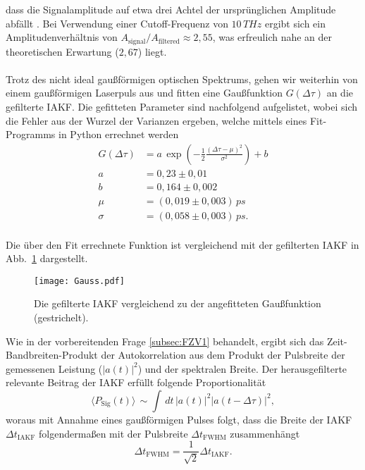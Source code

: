 dass die Signalamplitude auf etwa drei Achtel der ursprünglichen Amplitude abfällt \cite{Anleitung}. Bei Verwendung einer 
Cutoff-Frequenz von $10\,\si{THz}$ ergibt sich ein Amplitudenverhältnis von 
$A_{\text{signal}}/A_{\text{filtered}} \approx 2,55$, was erfreulich nahe an der theoretischen Erwartung ($2,67$) liegt. \\\\
Trotz des nicht ideal gaußförmigen optischen Spektrums, gehen wir weiterhin von einem gaußförmigen 
Laserpuls aus und fitten eine Gaußfunktion $G(\Delta\tau)$ an die gefilterte IAKF. 
Die gefitteten Parameter sind nachfolgend aufgelistet, wobei sich die Fehler aus der Wurzel der Varianzen ergeben, 
welche mittels eines Fit-Programms in Python errechnet werden
\begin{align}
    G(\Delta\tau) &= a\,\exp\left(-\frac{1}{2}\frac{(\Delta\tau - \mu)^2}{\sigma^2}\right) + b \\
    a &= 0,23 \pm 0,01 \\
    b &= 0,164 \pm 0,002 \\
    \mu &= (0,019 \pm 0,003)\,\si{ps} \\
    \sigma &= (0,058 \pm 0,003)\,\si{ps}.
\end{align} \,\\
Die über den Fit errechnete Funktion ist vergleichend mit der gefilterten IAKF in Abb.~\ref{fig:gauss}
dargestellt.
\begin{figure}[h!]
    \centering
    \texttt{[image: Gauss.pdf]}
    \caption{\label{fig:gauss}Die gefilterte IAKF vergleichend zu der angefitteten Gaußfunktion (gestrichelt).}
\end{figure}\FloatBarrier
Wie in der vorbereitenden Frage \ref{subsec:FZV1} behandelt, ergibt sich 
das Zeit-Bandbreiten-Produkt der Autokorrelation aus dem Produkt der Pulsbreite 
der gemessenen Leistung ($\left\vert a(t) \right\vert^{2}$) und der spektralen Breite. 
Der herausgefilterte relevante Beitrag der IAKF erfüllt folgende Proportionalität
\begin{equation}
    \langle P_{\text{Sig}}(t) \rangle \,\sim \int\,dt\,\left\vert a(t) \right\vert^{2}\left\vert a(t-\Delta\tau)\right\vert^{2}, 
\end{equation}
woraus mit Annahme eines gaußförmigen Pulses folgt, dass die Breite der IAKF $\Delta t_{\text{IAKF}}$ folgendermaßen 
mit der Pulsbreite $\Delta t_{\text{FWHM}}$ zusammenhängt
\begin{equation}
    \Delta t_{\text{FWHM}} = \frac{1}{\sqrt{2}}\Delta t_{\text{IAKF}}.
\end{equation}
